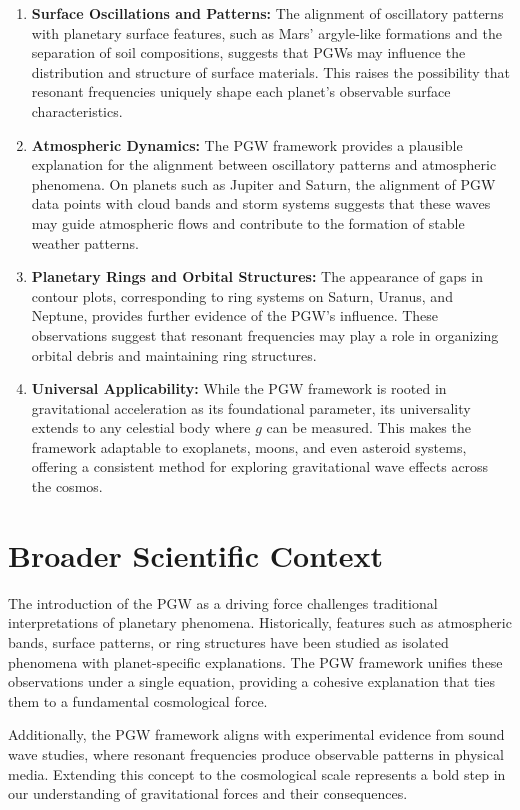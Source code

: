 \documentclass[12pt]{article}
\begin{document}
\begin{enumerate}
    \item \textbf{Surface Oscillations and Patterns:} The alignment of oscillatory patterns with planetary surface features, such as Mars’ argyle-like formations and the separation of soil compositions, suggests that PGWs may influence the distribution and structure of surface materials. This raises the possibility that resonant frequencies uniquely shape each planet’s observable surface characteristics.
    \item \textbf{Atmospheric Dynamics:} The PGW framework provides a plausible explanation for the alignment between oscillatory patterns and atmospheric phenomena. On planets such as Jupiter and Saturn, the alignment of PGW data points with cloud bands and storm systems suggests that these waves may guide atmospheric flows and contribute to the formation of stable weather patterns.
    \item \textbf{Planetary Rings and Orbital Structures:} The appearance of gaps in contour plots, corresponding to ring systems on Saturn, Uranus, and Neptune, provides further evidence of the PGW’s influence. These observations suggest that resonant frequencies may play a role in organizing orbital debris and maintaining ring structures.
    \item \textbf{Universal Applicability:} While the PGW framework is rooted in gravitational acceleration as its foundational parameter, its universality extends to any celestial body where \(g\) can be measured. This makes the framework adaptable to exoplanets, moons, and even asteroid systems, offering a consistent method for exploring gravitational wave effects across the cosmos.
\end{enumerate}

\section*{Broader Scientific Context}

The introduction of the PGW as a driving force challenges traditional interpretations of planetary phenomena. Historically, features such as atmospheric bands, surface patterns, or ring structures have been studied as isolated phenomena with planet-specific explanations. The PGW framework unifies these observations under a single equation, providing a cohesive explanation that ties them to a fundamental cosmological force.

Additionally, the PGW framework aligns with experimental evidence from sound wave studies, where resonant frequencies produce observable patterns in physical media. Extending this concept to the cosmological scale represents a bold step in our understanding of gravitational forces and their consequences.
\end{document}
